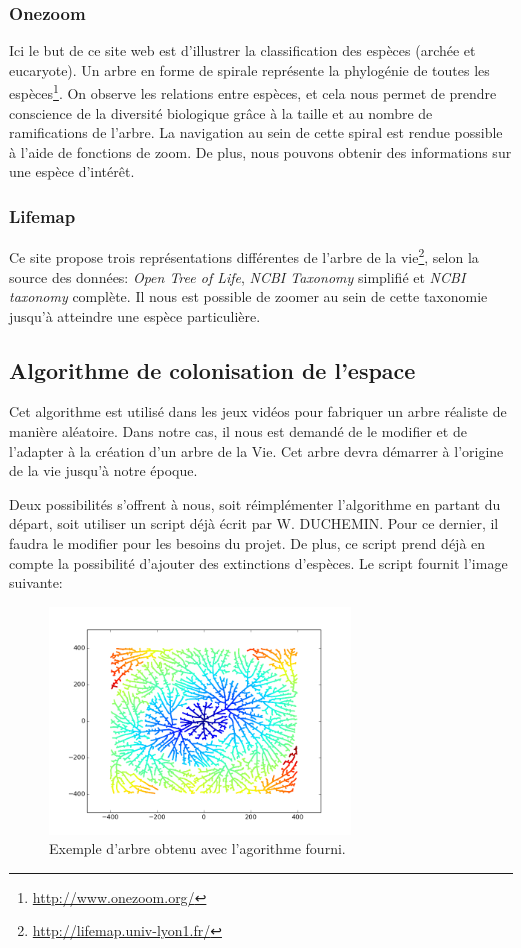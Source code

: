 \documentclass[a4paper]{article}
\begin{document}
		\subsubsection{Onezoom}
			Ici le but de ce site web est d'illustrer la classification des espèces (archée et eucaryote). Un arbre en forme de spirale représente la phylogénie de toutes les espèces\footnote{\url{http://www.onezoom.org/}}. On observe les relations entre espèces, et cela nous permet de prendre conscience de la diversité biologique grâce à la taille et au nombre de ramifications de l'arbre.
			La navigation au sein de cette spiral est rendue possible à l'aide de fonctions de zoom. De plus, nous pouvons obtenir des informations sur une espèce d'intérêt.
			    	
		\subsubsection{Lifemap}
			Ce site propose trois représentations différentes de l'arbre de la vie\footnote{\url{http://lifemap.univ-lyon1.fr/}}, selon la source des données: \emph{Open Tree of Life}, \emph{NCBI Taxonomy} simplifié et \emph{NCBI taxonomy} complète. Il nous est possible de zoomer au sein de cette taxonomie jusqu'à atteindre une espèce particulière.

	\subsection{Algorithme de colonisation de l'espace}
		Cet algorithme est utilisé dans les jeux vidéos pour fabriquer un arbre réaliste de manière aléatoire. Dans notre cas, il nous est demandé de le modifier et de l’adapter à la création d’un arbre de la Vie. Cet arbre devra démarrer à l’origine de la vie jusqu’à notre époque.
	
		Deux possibilités s’offrent à nous, soit réimplémenter l’algorithme en partant du départ, soit utiliser un script déjà écrit par W. DUCHEMIN. Pour ce dernier, il faudra le modifier pour les besoins du projet. De plus, ce script prend déjà en compte la possibilité d’ajouter des extinctions d’espèces. Le script fournit l'image suivante:

		\begin{figure}[!h]
			\centering
			\includegraphics[width=8cm]{./img/multipleExtinction.png}
			\caption{Exemple d'arbre obtenu avec l'agorithme fourni.}
		\end{figure}
	
\end{document}
